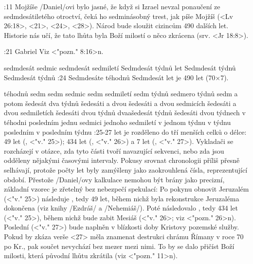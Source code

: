 :11 {Mojžíše} \x/Daniel/ovi bylo jasné, že když si Izrael nevzal ponaučení ze sedmdesátiletého otroctví, čeká ho sedminásobný trest, jak píše Mojžíš (<Lv 26:18>, <21>, <24>, <28>). Národ bude sloužit cizincům 490 dalších let. Historie nás učí, že tato lhůta byla Boží milostí o něco zkrácena (srv. <Jr 18:8>).
\dopsat


:21 {Gabriel} Viz <"pozn." 8:16>n. 

 {sedmdesát sedmic} {sedmdesát sedmiletí} {Sedmdesát týdnů let} {Sedmdesát týdnů} {Sedmdesát týdnů}
:24 {Sedmdesáte téhodnů} Sedmdesát  let je 490 let (70$\times$7).

\vdef %
    {téhodnů sedm}   %
    {sedm sedmic}   %
    {sedm sedmiletí}   %
    {sedm týdnů}   %
    {sedmero týdnů}   %
    {sedm a potom šedesát dva týdnů}   %
\vdef %
    {šedesáti a dvou}   %
    {šedesáti a dvou sedmicích}   %
    {šedesáti a dvou sedmiletích}   %
    {šedesáti dvou týdnů}   %
    {dvaašedesát týdnů}   %
    {šedesáti dvou týdnech}   %
\vdef %
    {v téhodni posledním}   %
    {jednu sedmici}   %
    {jednoho sedmiletí}   %
    {v jednom týdnu}   %
    {v týdnu posledním}   %
    {v posledním týdnu}   %
:25-27 {}  let je rozděleno do tří menších celků o délce: 49 let (, <"v." 25>); 434 let (, <"v." 26>) a 7 let (, <"v." 27>).
Vykladači se rozcházejí v otázce, zda tyto části tvoří navazující sekvenci, nebo zda jsou odděleny nějakými časovými intervaly. Pokusy srovnat chronologii příliš přesně selhávají, protože počty let byly zamýšleny jako zaokrouhlená čísla, reprezentující období. Přestože \x/Daniel/ovy kalkulace nemohou být brány jako precizní, základní vzorec je zřetelný bez nebezpečí spekulací:
Po pokynu obnovit Jeruzalém (<"v." 25>) následuje , tedy 49 let, během nichž byla rekonstrukce Jeruzaléma dokončena (viz knihy \x/Ezdráš/ a \x/Nehemiáš/). Poté následovalo , tedy 434 let (<"v." 25>), během nichž bude zabit Mesiáš (<"v." 26>; viz <"pozn." 26>n).  Poslední  (<"v." 27>) bude naplněn v blízkosti doby Kristovy pozemské služby. Pokud by zkáza verše <27> měla znamenat destrukci chrámu Římany v roce 70 po Kr., pak součet  nevychází bez mezer mezi nimi. To by se dalo přičíst Boží milosti, která původní lhůtu zkrátila (viz <"pozn." 11>n).

